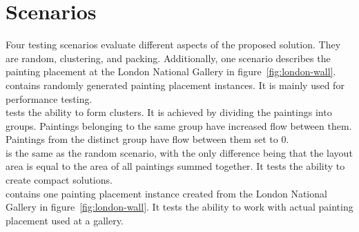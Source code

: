 \section{Scenarios}\label{sec:scenarios}

Four testing scenarios evaluate different aspects of the proposed solution.
They are random, clustering, and packing.
Additionally, one scenario describes the painting placement at the London National Gallery in figure~\ref{fig:london-wall}. \\

 contains randomly generated painting placement instances.
It is mainly used for performance testing.
\\

 tests the ability to form clusters.
It is achieved by dividing the paintings into groups.
Paintings belonging to the same group have increased flow between them.
Paintings from the distinct group have flow between them set to 0.
\\

 is the same as the random scenario, with the only difference being that the layout area is equal to the area of all paintings summed together.
It tests the ability to create compact solutions.
\\

 contains one painting placement instance created from the London National Gallery in figure~\ref{fig:london-wall}.
It tests the ability to work with actual painting placement used at a gallery.
\\
